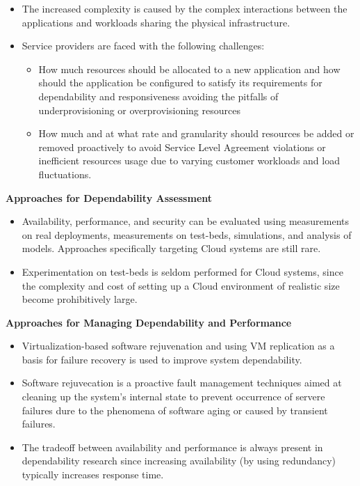 \begin{itemize}
\begin{itemize}
  	\item The increased complexity is caused by the complex interactions between the applications and workloads sharing the physical infrastructure.
  	\item Service providers are faced with the following challenges:
  	\begin{itemize}
       \item How much resources should be allocated to a new application and how should the application be configured to satisfy its requirements for dependability and responsiveness avoiding the pitfalls of underprovisioning or overprovisioning resources
       \item How much and at what rate and granularity should resources be added or removed proactively to avoid Service Level Agreement violations or inefficient resources usage due to varying customer workloads and load fluctuations. 
    \end{itemize}
  \end{itemize}
\end{itemize}

\textbf{Approaches for Dependability Assessment}
\begin{itemize}
  \item Availability, performance, and security can be evaluated using measurements on real deployments, measurements on test-beds, simulations, and analysis of models. Approaches specifically targeting Cloud systems are still rare.
  \item Experimentation on test-beds is seldom performed for Cloud systems, since the complexity and cost of setting up a Cloud environment of realistic size become prohibitively large.
\end{itemize}

\textbf{Approaches for Managing Dependability and Performance}
\begin{itemize}
  \item Virtualization-based software rejuvenation and using VM replication as a basis for failure recovery is used to improve system dependability.
  \item Software rejuvecation is a proactive fault management techniques aimed at cleaning up the system's internal state to prevent occurrence of servere failures dure to the phenomena of software aging or caused by transient failures.
  \item The tradeoff between availability and performance is always present in dependability research since increasing availability (by using redundancy) typically increases response time.
\end{itemize}

